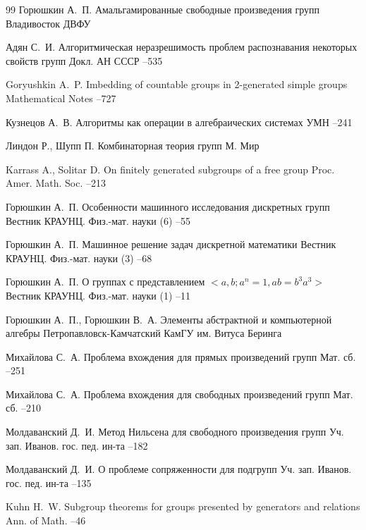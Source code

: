 \documentclass[twoside]{mfitjournal}
\begin{document}
\begin{thebibliography}{99}
\by Горюшкин А.~П.
\book Амальгамированные свободные произведения групп 
\publaddr Владивосток
\publ ДВФУ

\by Адян С.~И.
\paper Алгоритмическая неразрешимость проблем распознавания некоторых свойств групп
\jour Докл. АН СССР
--535

\by Goryushkin A.~P.
\paper Imbedding of countable groups in 2-generated simple groups 
\jour Mathematical Notes
--727

\by Кузнецов А.~В.
\paper Алгоритмы как операции в алгебраических системах 
\jour УМН
--241

\by Линдон Р., Шупп П. 
\book Комбинаторная теория групп  
\publaddr М.
\publ Мир

\by Karrass A., Solitar D.
\paper On finitely generated subgroups of a free group 
\jour Proc. Amer. Math. Soc.
--213

\by Горюшкин А.~П.
\paper Особенности машинного исследования дискретных групп
\jour Вестник КРАУНЦ. Физ.-мат. науки
(6)
--55


\by Горюшкин А.~П.
\paper Машинное решение задач дискретной математики 
\jour Вестник КРАУНЦ. Физ.-мат. науки
(3)
--68

\by Горюшкин А.~П.
\paper О группах с представлением $< a, b; a^n = 1, ab = b^3a^3 >$ 
\jour Вестник КРАУНЦ. Физ.-мат. науки
(1)
--11

\by Горюшкин А.~П., Горюшкин В.~А. 
\book Элементы абстрактной и компьютерной алгебры  
\publaddr Петропавловск-Камчатский
\publ КамГУ им. Витуса Беринга

\by Михайлова С.~А.
\paper Проблема вхождения для прямых произведений групп 
\jour Мат. сб.
--251

\by Михайлова С.~А.
\paper Проблема вхождения для свободных произведений групп  
\jour Мат. сб.
--210

\by Молдаванский Д.~И.
\paper Метод Нильсена для свободного произведения групп  
\jour Уч. зап. Иванов. гос. пед. ин-та
--182

\by Молдаванский Д.~И.
\paper О проблеме сопряженности для подгрупп   
\jour Уч. зап. Иванов. гос. пед. ин-та
--135

\by Kuhn H.~W.
\paper Subgroup theorems for groups presented by generators and relations 
\jour Ann. of Math.
--46

\end{thebibliography}  

\end{document}
